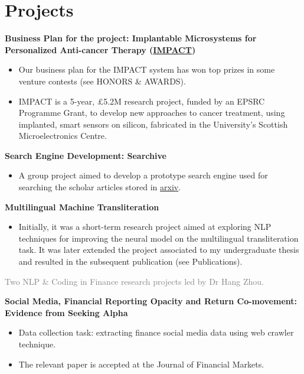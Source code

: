 \documentclass[%
               doublesided,
               paper=a4,
               fontsize=11pt
              ]{my-resume}
\begin{document}
\section{Projects}
\textbf{Business Plan for the project: Implantable Microsystems for Personalized Anti-cancer Therapy (\href{https://www.eng.ed.ac.uk/research/projects/impact-implantable-microsystems-personalised-anti-cancer-therapy}{IMPACT})}
\smallskip
\begin{itemize}
    \item Our business plan for the IMPACT system has won top prizes in some venture contests (see HONORS \& AWARDS).
    \item IMPACT is a 5-year, £5.2M research project, funded by an EPSRC Programme Grant, to develop new approaches to cancer treatment, using implanted, smart sensors on silicon, fabricated in the University's Scottish Microelectronics Centre.
\end{itemize}
\divider

\textbf{Search Engine Development: Searchive}
\smallskip
\begin{itemize}
    \item A group project aimed to develop a prototype search engine used for searching the scholar articles stored in \href{https://arxiv.org/}{arxiv}. 
\end{itemize}
\divider

\textbf{Multilingual Machine Transliteration}
\smallskip
\begin{itemize}
\item Initially, it was a short-term research project aimed at exploring NLP techniques for improving the neural model on the multilingual transliteration task. It was later extended the project associated to my undergraduate thesis and resulted in the subsequent publication (see Publications).
\end{itemize}
\divider

\textcolor{gray}{Two NLP \& Coding in Finance research projects led by Dr Hang Zhou.}
\smallskip

\textbf{Social Media, Financial Reporting Opacity and Return Co-movement: Evidence from Seeking Alpha}
\smallskip
\begin{itemize}
    \item Data collection task: extracting finance social media data using web crawler technique.
    \item The relevant paper is accepted at the Journal of Financial Markets.
\end{itemize}
\smallskip
\end{document}
